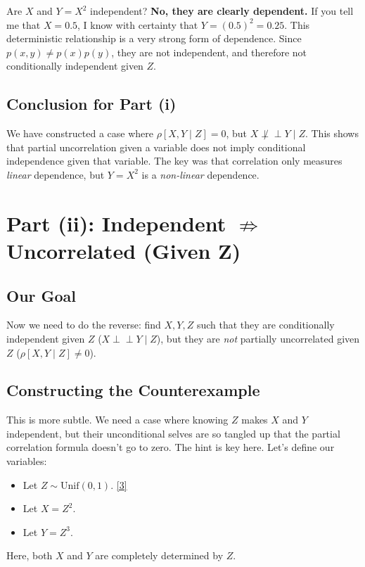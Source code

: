 \documentclass[11pt,a4paper]{article}
\begin{document}
Are $X$ and $Y=X^2$ independent? \textbf{No, they are clearly dependent.} If you tell me that $X=0.5$, I know with certainty that $Y = (0.5)^2 = 0.25$. This deterministic relationship is a very strong form of dependence. Since $p(x,y) \neq p(x)p(y)$, they are not independent, and therefore not conditionally independent given $Z$.

\subsection{Conclusion for Part (i)}
We have constructed a case where $\rho[X, Y \mid Z] = 0$, but $X \not\perp\perp Y \mid Z$. This shows that partial uncorrelation given a variable does not imply conditional independence given that variable. The key was that correlation only measures \emph{linear} dependence, but $Y=X^2$ is a \emph{non-linear} dependence.

\section{Part (ii): Independent \texorpdfstring{$\nRightarrow$}{does not imply} Uncorrelated (Given Z)}

\subsection{Our Goal}
Now we need to do the reverse: find $X, Y, Z$ such that they are conditionally independent given $Z$ ($X \perp\perp Y \mid Z$), but they are \emph{not} partially uncorrelated given $Z$ ($\rho[X, Y \mid Z] \neq 0$).

\subsection{Constructing the Counterexample}
This is more subtle. We need a case where knowing $Z$ makes $X$ and $Y$ independent, but their unconditional selves are so tangled up that the partial correlation formula doesn't go to zero. The hint is key here.
Let's define our variables:
\begin{itemize}
    \item Let $Z \sim \text{Unif}(0, 1)$. \hyperlink{note3}{[3]}
    \item Let $X = Z^2$.
    \item Let $Y = Z^3$.
\end{itemize}
Here, both $X$ and $Y$ are completely determined by $Z$.
\end{document}
